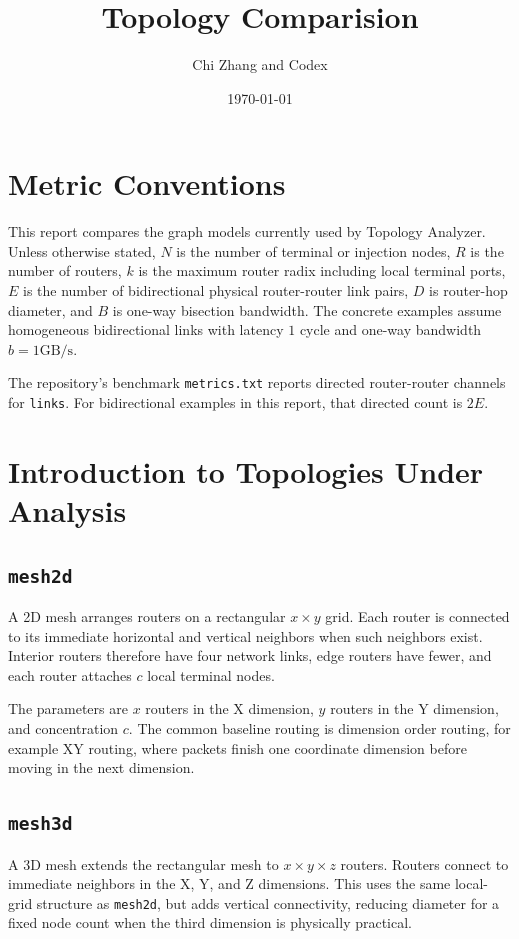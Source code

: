\documentclass[11pt]{article}
\title{Topology Comparision}
\author{Chi Zhang and Codex}
\date{\today}
\newcommand{\toponame}[1]{\texttt{#1}}
\newcommand{\Gbps}{\mathrm{GB/s}}
\begin{document}
\maketitle

\section*{Metric Conventions}

This report compares the graph models currently used by Topology Analyzer.
Unless otherwise stated, $N$ is the number of terminal or injection nodes,
$R$ is the number of routers, $k$ is the maximum router radix including local
terminal ports, $E$ is the number of bidirectional physical router-router link
pairs, $D$ is router-hop diameter, and $B$ is one-way bisection bandwidth. The
concrete examples assume homogeneous bidirectional links with latency
$1$ cycle and one-way bandwidth $b=1\Gbps$.

The repository's benchmark \texttt{metrics.txt} reports directed
router-router channels for \texttt{links}. For bidirectional examples in this
report, that directed count is $2E$.

\section{Introduction to Topologies Under Analysis}

\subsection{\toponame{mesh2d}}

A 2D mesh arranges routers on a rectangular $x \times y$ grid. Each router is
connected to its immediate horizontal and vertical neighbors when such
neighbors exist. Interior routers therefore have four network links, edge
routers have fewer, and each router attaches $c$ local terminal nodes.

The parameters are $x$ routers in the X dimension, $y$ routers in the Y
dimension, and concentration $c$. The common baseline routing is dimension
order routing, for example XY routing, where packets finish one coordinate
dimension before moving in the next dimension.

\subsection{\toponame{mesh3d}}

A 3D mesh extends the rectangular mesh to $x \times y \times z$ routers.
Routers connect to immediate neighbors in the X, Y, and Z dimensions. This
uses the same local-grid structure as \toponame{mesh2d}, but adds vertical
connectivity, reducing diameter for a fixed node count when the third dimension
is physically practical.
\end{document}
